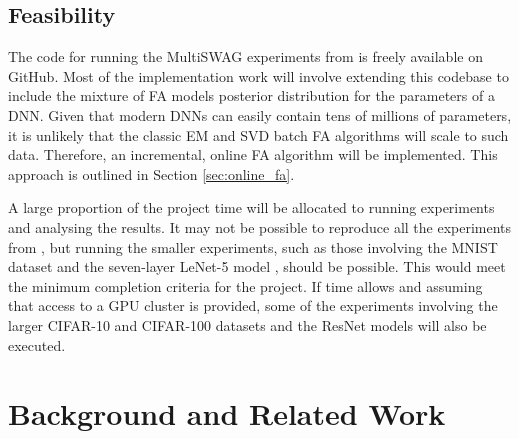 \documentclass[a4paper,11pt]{article}
\begin{document}

\subsection{Feasibility}

The code for running the MultiSWAG experiments from \cite{izmailov2020} is freely available on GitHub. Most of the implementation work will involve extending this codebase to include the mixture of FA models posterior distribution for the parameters of a DNN. Given that modern DNNs can easily contain tens of millions of parameters, it is unlikely that the classic EM and SVD batch FA algorithms will scale to such data. Therefore, an incremental, online FA algorithm will be implemented. This approach is outlined in Section \ref{sec:online_fa}.


A large proportion of the project time will be allocated to running experiments and analysing the results. It may not be possible to reproduce all the experiments from \cite{izmailov2020}, but running the smaller experiments, such as those involving the MNIST dataset \cite{deng2012} and the seven-layer LeNet-5 model \cite{lecun1998},  should be possible. This would meet the minimum completion criteria for the project. If time allows and assuming that access to a GPU cluster is provided, some of the experiments involving the larger CIFAR-10 and CIFAR-100 datasets \cite{krizhevsky09} and the ResNet models \cite{he2015} will also be executed. 




\section{Background and Related Work}
\end{document}
